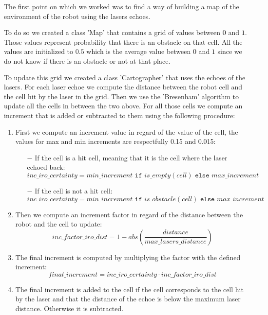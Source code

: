 The first point on which we worked was to find a way of building a map of the environment of the robot using the lasers echoes.

To do so we created a class 'Map' that contains a grid of values between $0$ and $1$.
Those values represent probability that there is an obstacle on that cell.
All the values are initialized to $0.5$ which is the average value between $0$ and $1$ since we do not know if there is an obstacle or not at that place.

To update this grid we created a class 'Cartographer' that uses the echoes of the lasers.
For each laser echoe we compute the distance between the robot cell and the cell hit by the laser in the grid.
Then we use the 'Bresenham' algorithm\cite{bresenham} to update all the cells in between the two above.
For all those cells we compute an increment that is added or subtracted to them using the following procedure:

\begin{enumerate}
    \item First we compute an increment value in regard of the value of the cell, the values for max and min increments are respectfully 0.15 and 0.015:
        \begin{itemize}
            \item[$-$] If the cell is a hit cell, meaning that it is the cell where the laser echoed back:
            $$
                inc\_iro\_certainty = min\_increment\texttt{ if }is\_empty(cell)\texttt{ else }max\_increment
            $$
            \item[$-$] If the cell is not a hit cell:
            $$
                inc\_iro\_certainty = min\_increment\texttt{ if }is\_obstacle(cell)\texttt{ else }max\_increment
            $$
        \end{itemize}
    \item Then we compute an increment factor in regard of the distance between the robot and the cell to update:
        $$
        inc\_factor\_iro\_dist = 1 - abs(\dfrac{distance}{max\_lasers\_distance})
        $$
    \item The final increment is computed by multiplying the factor with the defined increment:
        $$
        final\_increment = inc\_iro\_certainty \cdot inc\_factor\_iro\_dist
        $$
    \item The final increment is added to the cell if the cell corresponds to the cell hit by the laser and that the distance of the echoe is below the maximum laser distance.
        Otherwise it is subtracted.
\end{enumerate}

